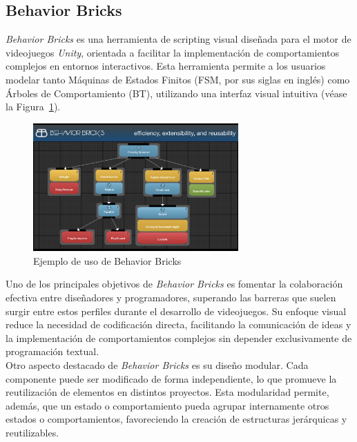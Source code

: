 \subsection{Behavior Bricks}

\textit{Behavior Bricks} es una herramienta de scripting visual diseñada para el motor de videojuegos \textit{Unity}, orientada a facilitar la implementación de comportamientos complejos en entornos interactivos. Esta herramienta permite a los usuarios modelar tanto Máquinas de Estados Finitos (FSM, por sus siglas en inglés) como Árboles de Comportamiento (BT), utilizando una interfaz visual intuitiva (véase la Figura~\ref{fig:BH_Figure}).\\	

\begin{figure}[t]
\centering
\includegraphics[width = 0.7\textwidth]{Imagenes/Behavior_Bricks.jpg}
\caption{Ejemplo de uso de Behavior Bricks}
\label{fig:BH_Figure}
\end{figure}

Uno de los principales objetivos de \textit{Behavior Bricks} es fomentar la colaboración efectiva entre diseñadores y programadores, superando las barreras que suelen surgir entre estos perfiles durante el desarrollo de videojuegos. Su enfoque visual reduce la necesidad de codificación directa, facilitando la comunicación de ideas y la implementación de comportamientos complejos sin depender exclusivamente de programación textual.\\

Otro aspecto destacado de \textit{Behavior Bricks} es su diseño modular. Cada componente puede ser modificado de forma independiente, lo que promueve la reutilización de elementos en distintos proyectos. Esta modularidad permite, además, que un estado o comportamiento pueda agrupar internamente otros estados o comportamientos, favoreciendo la creación de estructuras jerárquicas y reutilizables.\\

